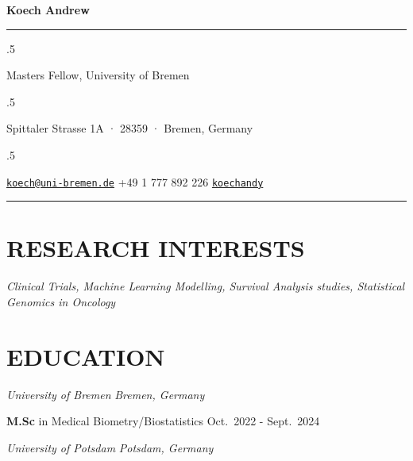 \documentclass[13pt,]{article}
\providecommand{\tightlist}{%
  \setlength{\itemsep}{0pt}\setlength{\parskip}{0pt}}
\renewenvironment{itemize}{
  \begin{list}{}{
    \setlength{\leftmargin}{1.5em}
  }
}{
  \end{list}
}
\begin{document}
\centerline{\huge \bf Koech Andrew}

\vspace{2 mm}

\hrule

\vspace{2 mm}

\moveleft.5\hoffset\centerline{Masters Fellow, University of Bremen}
\moveleft.5\hoffset\centerline{Spittaler Strasse 1A · 28359 · Bremen,
Germany}
\moveleft.5\hoffset\centerline{ \faEnvelopeO \hspace{1 mm} \href{mailto:}{\tt \href{mailto:koech@uni-bremen.de}{\nolinkurl{koech@uni-bremen.de}}} \hspace{1 mm}  \faPhone \hspace{1 mm}  +49
1 777 892
226  \hspace{1 mm}  \faGithub \hspace{1 mm} \href{http://github.com/koechandy}{\tt koechandy} \hspace{1 mm}      } 

\vspace{2 mm}

\hrule


\hypertarget{research-interests}{%
\section{\texorpdfstring{\textbf{RESEARCH
INTERESTS}}{RESEARCH INTERESTS}}\label{research-interests}}

\begin{itemize}
\tightlist
\item
  \emph{Clinical Trials, Machine Learning Modelling, Survival Analysis
  studies, Statistical Genomics in Oncology}
\end{itemize}

\hypertarget{education}{%
\section{\texorpdfstring{\textbf{EDUCATION}}{EDUCATION}}\label{education}}

\emph{University of Bremen} \hfill \emph{Bremen, Germany}

\begin{itemize}
\tightlist
\item
  \textbf{M.Sc} in Medical Biometry/Biostatistics \hfill Oct.~2022 -
  Sept.~2024
\end{itemize}

\emph{University of Potsdam} \hfill \emph{Potsdam, Germany}
\end{document}
